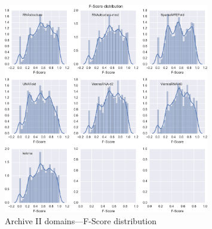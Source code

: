 \documentclass{cshonours}
\begin{document}
\begin{figure}[h]
\centering
\includegraphics[width=0.8\textwidth]{res/archiveii_domains_fscore.png}
\caption{Archive II domains---F-Score distribution}
\label{fig:archiveii_fscore}
\end{figure}
\end{document}
